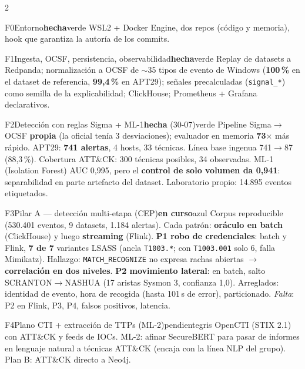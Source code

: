 \documentclass[9pt,a4paper]{extarticle}
\newcommand{\cod}[1]{\texttt{#1}}
\newcommand{\fl}{$\rightarrow$}
\newcommand{\titulo}[1]{\vspace{0.2em}{\large\bfseries\color{azul}#1}\par\vspace{0.1em}{\color{azul}\hrule height 0.6pt}\vspace{0.35em}}
\newcommand{\hecho}{\textbf{hecha}}
\newcommand{\curso}{\textbf{en curso}}
\newcommand{\pend}{pendiente}
\begin{document}
\begin{multicols}{2}
\titulo{Las fases}

\begin{fase}{F0}{Entorno}{\hecho}{verde}
WSL2 + Docker Engine, dos repos (código y memoria), hook que garantiza la autoría de los commits.
\end{fase}

\begin{fase}{F1}{Ingesta, OCSF, persistencia, observabilidad}{\hecho}{verde}
Replay de datasets a Redpanda; normalización a OCSF de $\sim$35 tipos de evento de Windows
(\textbf{100\,\%} en el dataset de referencia, \textbf{99,4\,\%} en APT29); señales precalculadas
(\cod{signal\_*}) como semilla de la explicabilidad; ClickHouse; Prometheus + Grafana declarativos.
\end{fase}

\begin{fase}{F2}{Detección con reglas Sigma + ML-1}{\hecho{} (30-07)}{verde}
Pipeline Sigma\fl OCSF \textbf{propia} (la oficial tenía 3 desviaciones); evaluador en memoria
\textbf{73$\times$} más rápido. APT29: \textbf{741 alertas}, 4 hosts, 33 técnicas. Línea base ingenua
741\fl87 (88,3\,\%). Cobertura ATT\&CK: 300 técnicas posibles, 34 observadas. ML-1 (Isolation Forest)
AUC 0,995, pero el \textbf{control de solo volumen da 0,941}: separabilidad en parte artefacto del dataset.
Laboratorio propio: 14.895 eventos etiquetados.
\end{fase}

\begin{fase}{F3}{Pilar A — detección multi-etapa (CEP)}{\curso}{azul}
Corpus reproducible (530.401 eventos, 9 datasets, 1.184 alertas). Cada patrón: \textbf{oráculo en batch}
(ClickHouse) y luego \textbf{streaming} (Flink).
\textbf{P1 robo de credenciales}: batch y Flink, \textbf{7 de 7} variantes LSASS (ancla \cod{T1003.*};
con \cod{T1003.001} solo 6, falla Mimikatz). Hallazgo: \cod{MATCH\_RECOGNIZE} no expresa rachas abiertas
\fl{} \textbf{correlación en dos niveles}.
\textbf{P2 movimiento lateral}: en batch, salto SCRANTON\fl NASHUA (17 aristas Sysmon 3, confianza 1,0).
Arreglados: identidad de evento, hora de recogida (hasta 101\,s de error), particionado.
\textit{Falta}: P2 en Flink, P3, P4, falsos positivos, latencia.
\end{fase}

\begin{fase}{F4}{Plano CTI + extracción de TTPs (ML-2)}{\pend}{gris}
OpenCTI (STIX 2.1) con ATT\&CK y feeds de IOCs. ML-2: afinar SecureBERT para pasar de informes en
lenguaje natural a técnicas ATT\&CK (encaja con la línea NLP del grupo). Plan B: ATT\&CK directo a Neo4j.
\end{fase}


\end{multicols}
\end{document}
